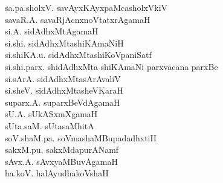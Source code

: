 {\begin{multicols}{2}
\begin{tabbing}
sa.pa.sholxV. \> savAyxKAyxpaMcasholxVkiV\\[2pt]
savaR.A. \> savaRjAcnxnoVtatxrAgamaH\\[2pt]
si.A. \> sidAdhxMtAgamaH\\[2pt]
si.shi. \> sidAdhxMtashiKAmaNiH\\[2pt]
si.shiKA.u. \> sidAdhxMtashiKoVpaniSatf\\[2pt]
si.shi.parx. \> shidAdhxMta shiKAmaNi parxvacana parxBe\\[2pt]
si.sArA. \> sidAdhxMtasArAvaliV\\[2pt]
si.sheV. \> sidAdhxMtasheVKaraH\\[2pt]
suparx.A. \> suparxBeVdAgamaH\\[2pt]
sU.A. \> sUkASxmXgamaH\\[2pt]
sUta.saM. \> sUtasaMhitA\\[2pt]
soV.shaM.pa. \> soVmashaMBupadadhxtiH\\[2pt]
sakxM.pu. \> sakxMdapurANamf\\[2pt]
sAvx.A. \> sAvxyaMBuvAgamaH\\[2pt]
ha.koV. \> halAyudhakoVshaH
\end{tabbing}
\end{multicols}
}


